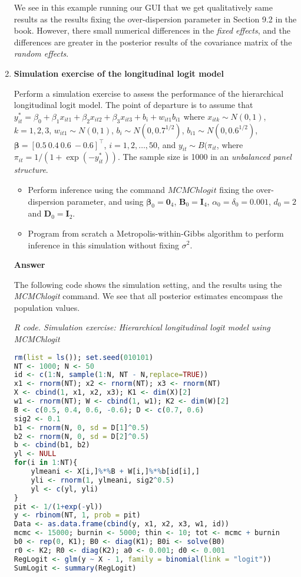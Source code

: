 \begin{enumerate}[leftmargin=*]
We see in this example running our GUI that we get qualitatively same results as the results fixing the over-dispersion parameter in Section 9.2 in the book. However, there small numerical differences in the \textit{fixed effects}, and the differences are greater in the posterior results of the covariance matrix of the \textit{random effects}.

\item \textbf{Simulation exercise of the longitudinal logit model}

Perform a simulation exercise to assess the performance of the hierarchical longitudinal logit model. The point of departure is to assume that $y_{it}^*=\beta_0+\beta_1x_{it1}+\beta_2x_{it2}+\beta_3x_{it3}+b_i+w_{it1}b_{i1}$ where $x_{itk}\sim N(0,1)$, $k=1,2,3$, $w_{it1}\sim N(0,1)$, $b_i\sim N(0, 0.7^{1/2})$, $b_{i1}\sim N(0, 0.6^{1/2})$, $\bm{\beta}=[0.5 \ 0.4 \ 0.6 \ -0.6]^{\top}$, $i=1,2,\dots,50$, and $y_{it}\sim B(\pi_{it}$, where $\pi_{it}=1/(1+\exp(-y_{it}^*))$. The sample size is 1000 in an \textit{unbalanced panel structure}.

\begin{itemize}
	\item Perform inference using the command $MCMChlogit$ fixing the over-dispersion parameter, and using $\bm{\beta}_0=\bm{0}_4$, $\bm{B}_0=\bm{I}_4$, $\alpha_0=\delta_0=0.001$, $d_0=2$ and $\bm{D}_0=\bm{I}_2$.
	\item Program from scratch a Metropolis-within-Gibbs algorithm to perform inference in this simulation without fixing $\sigma^2$.  
\end{itemize}

\textbf{Answer}

The following code shows the simulation setting, and the results using the \textit{MCMChlogit} command. We see that all posterior estimates encompass the population values.

\begin{tcolorbox}[enhanced,width=4.67in,center upper,
	fontupper=\large\bfseries,drop shadow southwest,sharp corners]
	\textit{R code. Simulation exercise: Hierarchical longitudinal logit model using MCMChlogit}
	\begin{VF}
		\begin{lstlisting}[language=R]
rm(list = ls()); set.seed(010101)
NT <- 1000; N <- 50
id <- c(1:N, sample(1:N, NT - N,replace=TRUE))
x1 <- rnorm(NT); x2 <- rnorm(NT); x3 <- rnorm(NT) 
X <- cbind(1, x1, x2, x3); K1 <- dim(X)[2]
w1 <- rnorm(NT); W <- cbind(1, w1); K2 <- dim(W)[2]
B <- c(0.5, 0.4, 0.6, -0.6); D <- c(0.7, 0.6)
sig2 <- 0.1
b1 <- rnorm(N, 0, sd = D[1]^0.5)
b2 <- rnorm(N, 0, sd = D[2]^0.5)
b <- cbind(b1, b2)
yl <- NULL
for(i in 1:NT){
	ylmeani <- X[i,]%*%B + W[i,]%*%b[id[i],]
	yli <- rnorm(1, ylmeani, sig2^0.5)
	yl <- c(yl, yli)
}
pit <- 1/(1+exp(-yl))
y <- rbinom(NT, 1, prob = pit)
Data <- as.data.frame(cbind(y, x1, x2, x3, w1, id))
mcmc <- 15000; burnin <- 5000; thin <- 10; tot <- mcmc + burnin
b0 <- rep(0, K1); B0 <- diag(K1); B0i <- solve(B0) 
r0 <- K2; R0 <- diag(K2); a0 <- 0.001; d0 <- 0.001
RegLogit <- glm(y ~ X - 1, family = binomial(link = "logit"))
SumLogit <- summary(RegLogit)


\end{lstlisting}
\end{VF}
\end{tcolorbox}
\end{enumerate}
